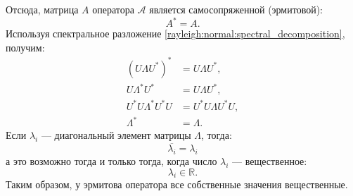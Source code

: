 Отсюда, матрица $A$ оператора $\mathcal{A}$ является самосопряженной (эрмитовой):
\[
    A^* = A.
\]
Используя спектральное разложение \eqref{rayleigh:normal:spectral_decomposition}, получим:
\begin{align*}
    \left ( U \Lambda U^* \right )^* & = U \Lambda U^* , \\
    U \Lambda^* U^* & = U \Lambda U^* , \\
    U^* U \Lambda^* U^* U & = U^* U \Lambda U^* U, \\
    \Lambda^* & = \Lambda .
\end{align*}
Если $\lambda_i$ --- диагональный элемент матрицы $\Lambda$, тогда:
\[
    \overline{\lambda_i} = \lambda_i
\]
а это возможно тогда и только тогда, когда число $\lambda_i$ --- вещественное:
\[
    \lambda_i \in \mathbb{R}.
\]
Таким образом, у эрмитова оператора все собственные значения вещественные.

